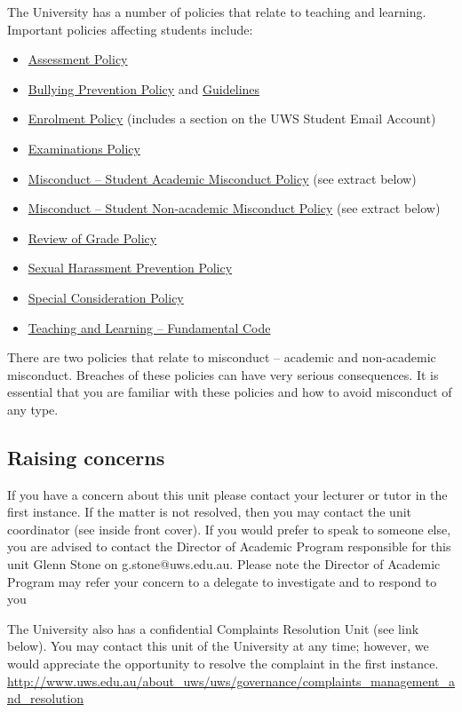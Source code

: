 \documentclass{uws_learning_guide}
\begin{document}
The University has a number of policies that relate to teaching and learning. Important policies affecting students include: 
\begin{itemize}
\item \href{http://policies.uws.edu.au/view.current.php?id=00227}{Assessment Policy}
\item \href{http://policies.uws.edu.au/view.current.php?id=00099}{Bullying Prevention Policy} and \href{http://policies.uws.edu.au/view.current.php?id=00240}{Guidelines}
\item \href{http://policies.uws.edu.au/view.current.php?id=00019}{Enrolment Policy} (includes a section on the UWS Student Email Account) 
\item \href{http://policies.uws.edu.au/view.current.php?id=00204}{Examinations Policy}
\item \href{http://policies.uws.edu.au/view.current.php?id=00051}{Misconduct -- Student Academic Misconduct Policy} (see extract below) 
\item \href{http://policies.uws.edu.au/view.current.php?id=00104}{Misconduct -- Student Non-academic Misconduct Policy} (see extract below) 
\item \href{http://policies.uws.edu.au/view.current.php?id=00203}{Review of Grade Policy}
\item \href{http://policies.uws.edu.au/view.current.php?id=00103}{Sexual Harassment Prevention Policy}
\item \href{http://policies.uws.edu.au/view.current.php?id=00205}{Special Consideration Policy}
\item \href{http://policies.uws.edu.au/view.current.php?id=00139}{Teaching and Learning -- Fundamental Code}
\end{itemize}

There are two policies that relate to misconduct -- academic and
non-academic misconduct. Breaches of these policies can have very
serious consequences. It is essential that you are familiar with these
policies and how to avoid misconduct of any type.

\subsection{Raising concerns}

If you have a concern about this unit please contact your lecturer or
tutor in the first instance. If the matter is not resolved, then you
may contact the unit coordinator (see inside front cover). If you
would prefer to speak to someone else, you are advised to contact the
Director of Academic Program responsible for this unit Glenn Stone on
g.stone@uws.edu.au. Please note the Director of Academic Program may
refer your concern to a delegate to investigate and to respond to you

The University also has a confidential Complaints Resolution Unit (see
link below). You may contact this unit of the University at any time;
however, we would appreciate the opportunity to resolve the complaint
in the first
instance. \url{http://www.uws.edu.au/about_uws/uws/governance/complaints_management_and_resolution}
\end{document}
